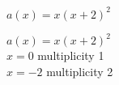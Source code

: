 {$a(x) = x(x + 2)^{2}$}
{$a(x) = x(x + 2)^{2}$\\
$x = 0$ multiplicity 1\\
$x = -2$ multiplicity 2

\begin{center}
\end{center}}
